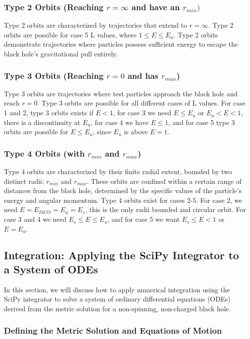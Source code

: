 \documentclass{article}
\begin{document}
\subsubsection{Type 2 Orbits (Reaching $ r = \infty $ and have an $r_{min})$}
Type 2 orbits are characterized by trajectories that extend to $ r = \infty $. Type 2 orbits are possible for case 5 L values,
where $ 1 \leq E \leq E_u $. Type 2 orbits demonstrate trajectories where particles possess sufficient energy to escape the
black hole's gravitational pull entirely.
\subsubsection{Type 3 Orbits (Reaching $r = 0$ and has $r_{max}$)}
Type 3 orbits are trajectories where test particles approach the black hole and reach $ r = 0 $. Type 3 orbits are possible for all
different cases of L values. For case 1 and 2, type 3 orbits exists if $E<1$, for case 3 we need $E \leq E_u$ or $E_u < E < 1$, there
is a discontinuity at $E_u$, for case 4 we have $E \leq 1$, and for case 5 type 3 orbits are possible for $E \leq E_u $, since $E_u$ is above $E=1$.
\subsubsection{Type 4 Orbits (with $r_{min}$ and $r_{max}$)}
Type 4 orbits are characterized by their finite radial extent, bounded by two distinct radii: $r_{min}$ and $ r_{max}$.
These orbits are confined within a certain range of distances from the black hole, determined by the specific values of the
particle's energy and angular momentum. Type 4 orbits exist for cases 2-5. For case 2, we need $E=E_{ISCO}=E_u=E_s$, this is
the only radii bounded and circular orbit. For case 3 and 4 we need $E_s \leq E \leq E_u$, and for case 5 we want $E_s \leq E < 1 $ or $E = E_u$.


\subsection{Integration: Applying the SciPy Integrator to a System of ODEs}

In this section, we will discuss how to apply numerical integration using the SciPy integrator to solve a system of ordinary differential equations
(ODEs) derived from the metric solution for a non-spinning, non-charged black hole.

\subsubsection{Defining the Metric Solution and Equations of Motion}
\end{document}
